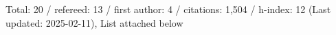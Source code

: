 Total: 20 / refereed: 13 / first author: 4 / citations: 1,504 / h-index: 12 (Last updated: 2025-02-11), List attached below